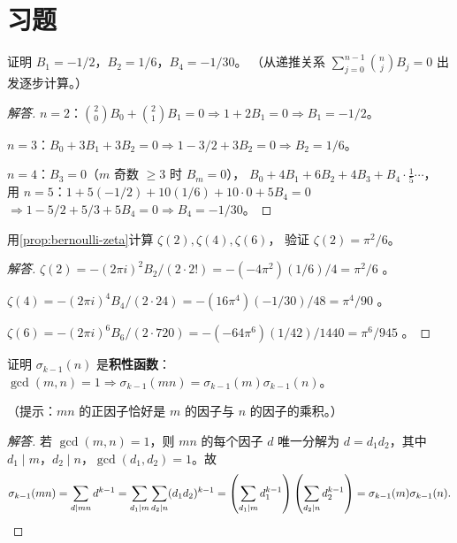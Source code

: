 \section{习题}
\label{sec:eisenstein-exercises}

\begin{exercise}
\label{ex:ch2-bernoulli-1}
证明 $B_1 = -1/2$，$B_2 = 1/6$，$B_4 = -1/30$。
（从递推关系 $\sum_{j=0}^{n-1}\binom{n}{j}B_j = 0$ 出发逐步计算。）
\end{exercise}

\begin{proof}[解答]
$n=2$：$\binom{2}{0}B_0 + \binom{2}{1}B_1 = 0 \Rightarrow 1 + 2B_1 = 0 \Rightarrow B_1 = -1/2$。

$n=3$：$B_0 + 3B_1 + 3B_2 = 0 \Rightarrow 1 - 3/2 + 3B_2 = 0 \Rightarrow B_2 = 1/6$。

$n=4$：$B_3 = 0$（$m$ 奇数 $\geq 3$ 时 $B_m = 0$），
$B_0 + 4B_1 + 6B_2 + 4B_3 + B_4 \cdot \frac{1}{5}\cdots$，
用 $n=5$：$1 + 5(-1/2) + 10(1/6) + 10 \cdot 0 + 5B_4 = 0$
$\Rightarrow 1 - 5/2 + 5/3 + 5B_4 = 0 \Rightarrow B_4 = -1/30$。
\end{proof}

\begin{exercise}
\label{ex:ch2-zeta-2}
用\cref{prop:bernoulli-zeta}计算 $\zeta(2), \zeta(4), \zeta(6)$，
验证 $\zeta(2) = \pi^2/6$。
\end{exercise}

\begin{proof}[解答]
$\zeta(2) = -(2\pi i)^2 B_2 / (2 \cdot 2!) = -(-4\pi^2)(1/6)/4 = \pi^2/6$ \checkmark。

$\zeta(4) = -(2\pi i)^4 B_4/(2 \cdot 24) = -(16\pi^4)(-1/30)/48 = \pi^4/90$ \checkmark。

$\zeta(6) = -(2\pi i)^6 B_6/(2 \cdot 720) = -(-64\pi^6)(1/42)/1440 = \pi^6/945$ \checkmark。
\end{proof}

\begin{exercise}
\label{ex:ch2-sigma-multiplicative}
证明 $\sigma_{k-1}(n)$ 是\textbf{积性函数}：$\gcd(m,n)=1 \Rightarrow \sigma_{k-1}(mn) = \sigma_{k-1}(m)\sigma_{k-1}(n)$。

（提示：$mn$ 的正因子恰好是 $m$ 的因子与 $n$ 的因子的乘积。）
\end{exercise}

\begin{proof}[解答]
若 $\gcd(m,n)=1$，则 $mn$ 的每个因子 $d$ 唯一分解为 $d = d_1 d_2$，其中 $d_1 \mid m$，$d_2 \mid n$，$\gcd(d_1, d_2) = 1$。故
\[
  \sigma_{k-1}(mn) = \sum_{d \mid mn} d^{k-1}
  = \sum_{d_1 \mid m}\sum_{d_2 \mid n} (d_1 d_2)^{k-1}
  = \left(\sum_{d_1 \mid m} d_1^{k-1}\right)\left(\sum_{d_2 \mid n} d_2^{k-1}\right)
  = \sigma_{k-1}(m)\sigma_{k-1}(n). \qedhere
\]
\end{proof}


